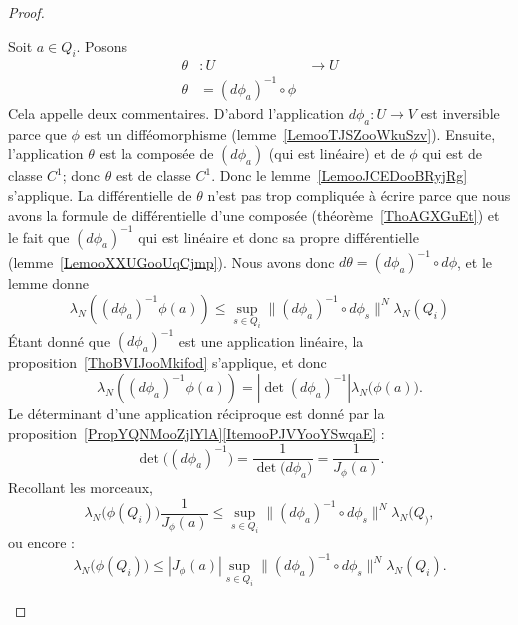 \begin{proof}
\begin{enumerate}
\begin{subproof}
			      Soit \( a\in Q_i\). Posons
			      \begin{equation}
				      \begin{aligned}
					      \theta & \colon U                   & \to U \\
					      \theta & =(d\phi_{a})^{-1}\circ\phi
				      \end{aligned}
			      \end{equation}
			      Cela appelle deux commentaires. D'abord l'application \( d\phi_{a}\colon U\to V\) est inversible parce que \( \phi\) est un difféomorphisme (lemme~\ref{LemooTJSZooWkuSzv}). Ensuite, l'application \( \theta\) est la composée de \( (d\phi_{a})\) (qui est linéaire) et de \( \phi\) qui est de classe \( C^1\); donc \( \theta\) est de classe \( C^1\). Donc le lemme~\ref{LemooJCEDooBRyjRg} s'applique. La différentielle de \( \theta\) n'est pas trop compliquée à écrire parce que nous avons la formule de différentielle d'une composée (théorème~\ref{ThoAGXGuEt}) et le fait que \( (d\phi_{a})^{-1}\) qui est linéaire et donc sa propre différentielle (lemme~\ref{LemooXXUGooUqCjmp}). Nous avons donc \( d\theta=(d\phi_a)^{-1}\circ d\phi\), et le lemme donne
			      \begin{equation}
				      \lambda_N\left( (d\phi_a)^{-1}\phi(a) \right)\leq \sup_{s\in Q_i}\|    (d\phi_a)^{-1}\circ d\phi_s  \|^N\lambda_N(Q_i)
			      \end{equation}
			      Étant donné que \( (d\phi_a)^{-1}\) est une application linéaire, la proposition~\ref{ThoBVIJooMkifod} s'applique, et donc
			      \begin{equation}
				      \lambda_N\left( (d\phi_a)^{-1}\phi(a) \right)=| \det(d\phi_a)^{-1} |\lambda_N\big( \phi(a) \big).
			      \end{equation}
			      Le déterminant d'une application réciproque est donné par la proposition~\ref{PropYQNMooZjlYlA}\ref{ItemooPJVYooYSwqaE} :
			      \begin{equation}
				      \det\big( (d\phi_a)^{-1} \big)=\frac{1}{ \det\big( d\phi_a \big) }=\frac{1}{ J_{\phi}(a) }.
			      \end{equation}
			      Recollant les morceaux,
			      \begin{equation}
				      \lambda_N\big( \phi(Q_i) \big)\frac{1}{ J_{\phi}(a) }\leq \sup_{s\in Q_i}\| (d\phi_a)^{-1}\circ d\phi_s \|^N\lambda_N(Q_),
			      \end{equation}
			      ou encore :
			      \begin{equation}
				      \lambda_N\big( \phi(Q_i) \big)\leq | J_{\phi}(a) |\sup_{s\in Q_i}\| (d\phi_a)^{-1}\circ d\phi_s \|^N\lambda_N(Q_i).

\end{equation}
\end{subproof}
\end{enumerate}
\end{proof}
